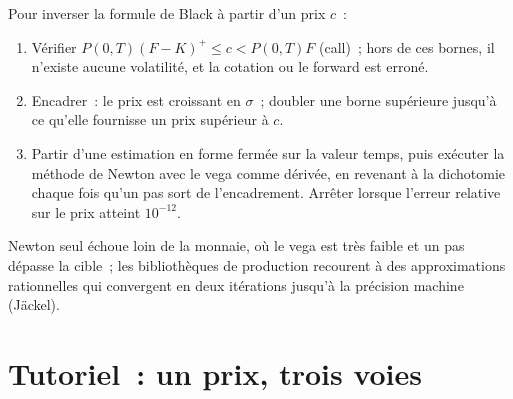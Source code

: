 \begin{method}\label{met:dv:black-scholes-three-ways:iv}
Pour inverser la formule de Black à partir d'un prix $c$~:
\begin{enumerate}
\item Vérifier $P(0,T)(F-K)^+\le c<P(0,T)F$ (call)~; hors de ces bornes, il n'existe
aucune volatilité, et la cotation ou le forward est erroné.
\item Encadrer~: le prix est croissant en $\sigma$~; doubler une borne supérieure jusqu'à ce qu'elle
fournisse un prix supérieur à $c$.
\item Partir d'une estimation en forme fermée sur la valeur temps, puis exécuter la méthode de Newton
avec le vega comme dérivée, en revenant à la dichotomie chaque fois qu'un pas sort de
l'encadrement. Arrêter lorsque l'erreur relative sur le prix atteint $10^{-12}$.
\end{enumerate}
Newton seul échoue loin de la monnaie, où le vega est très faible et un pas dépasse la cible~;
les bibliothèques de production recourent à des approximations rationnelles qui convergent en deux
itérations jusqu'à la précision machine (Jäckel).
\end{method}

\section{Tutoriel~: un prix, trois voies}\label{tut:dv:black-scholes-three-ways:tut}


